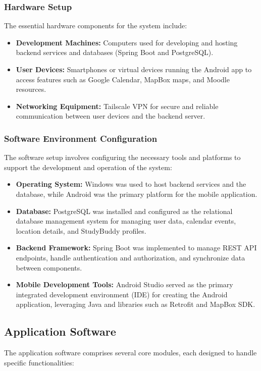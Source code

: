 \documentclass{article}
\begin{document}
\subsubsection{Hardware Setup}  
The essential hardware components for the system include:  
\begin{itemize}  
    \item \textbf{Development Machines: }Computers used for developing and hosting backend services and databases (Spring Boot and PostgreSQL).  
    \item \textbf{User Devices: }Smartphones or virtual devices running the Android app to access features such as Google Calendar, MapBox maps, and Moodle resources.  
    \item \textbf{Networking Equipment: }Tailscale VPN for secure and reliable communication between user devices and the backend server.  
\end{itemize}

\subsubsection{Software Environment Configuration}  
The software setup involves configuring the necessary tools and platforms to support the development and operation of the system:  
\begin{itemize}  
    \item \textbf{Operating System: }Windows was used to host backend services and the database, while Android was the primary platform for the mobile application.  
    \item \textbf{Database: }PostgreSQL was installed and configured as the relational database management system for managing user data, calendar events, location details, and StudyBuddy profiles.  
    \item \textbf{Backend Framework: }Spring Boot was implemented to manage REST API endpoints, handle authentication and authorization, and synchronize data between components.  
    \item \textbf{Mobile Development Tools: }Android Studio served as the primary integrated development environment (IDE) for creating the Android application, leveraging Java and libraries such as Retrofit and MapBox SDK.  
\end{itemize}

\subsection{Application Software}  
The application software comprises several core modules, each designed to handle specific functionalities:  
\end{document}
